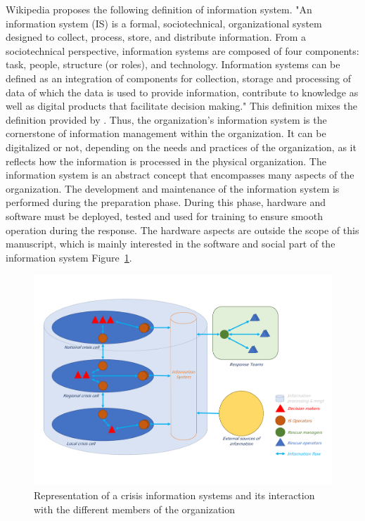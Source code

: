 Wikipedia \textcite{InformationSystem2021} proposes the following definition of information system.
"An information system (IS) is a formal, sociotechnical, organizational system designed to collect, process, store, and distribute information.
From a sociotechnical perspective, information systems are composed of four components: task, people, structure (or roles), and technology.
Information systems can be defined as an integration of components for collection, storage and processing of data of which the data is used
to provide information, contribute to knowledge as well as digital products that facilitate decision making."
This definition mixes the definition provided by \textcite{oharaManagingThreeLevels1999,piccoliInformationSystemsManagers2019,zwassInformationSystemDefinition}.
Thus, the organization's information system is the cornerstone of information management within the organization.
It can be digitalized or not, depending on the needs and practices of the organization, as it reflects how the information is processed in the physical organization.
The information system is an abstract concept that encompasses many aspects of the organization.
The development and maintenance of the information system is performed during the preparation phase.
During this phase, hardware and software must be deployed, tested and used for training to ensure smooth operation during the response.
The hardware aspects are outside the scope of this manuscript, which is mainly interested in the software and social part of the information system Figure~\ref{context:information-system}.

\begin{figure}
    \centering
    \includegraphics[width=\textwidth]{figures/chap-1/information-system.pdf}
    \caption{Representation of a crisis information systems and its interaction with the different members of the organization}
    \label{context:information-system}
\end{figure}

